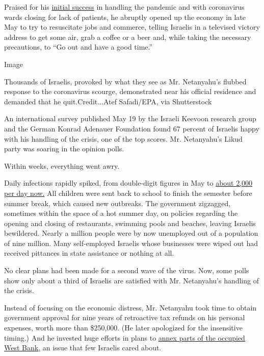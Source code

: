 Praised for his
\href{https://www.nytimes3xbfgragh.onion/2020/03/13/world/middleeast/israel-coronavirus-netanyahu.html?searchResultPosition=1}{initial
success} in handling the pandemic and with coronavirus wards closing for
lack of patients, he abruptly opened up the economy in late May to try
to resuscitate jobs and commerce, telling Israelis in a televised
victory address to get some air, grab a coffee or a beer and, while
taking the necessary precautions, to ``Go out and have a good time.''

Image

Thousands of Israelis, provoked by what they see as Mr. Netanyahu's
flubbed response to the coronavirus scourge, demonstrated near his
official residence and demanded that he quit.Credit...Atef Safadi/EPA,
via Shutterstock

An international survey published May 19 by the Israeli Keevoon research
group and the German Konrad Adenauer Foundation found 67 percent of
Israelis happy with his handling of the crisis, one of the top scores.
Mr. Netanyahu's Likud party was soaring in the opinion polls.

Within weeks, everything went awry.

Daily infections rapidly spiked, from double-digit figures in May to
\href{https://ourworldindata.org/coronavirus-data-explorer?zoomToSelection=true\&country=~ISR\&casesMetric=true\&dailyFreq=true\&hideControls=true\&smoothing=0\&pickerMetric=location\&pickerSort=asc}{about
2,000 per day now.} All children were sent back to school to finish the
semester before summer break, which caused new outbreaks. The government
zigzagged, sometimes within the space of a hot summer day, on policies
regarding the opening and closing of restaurants, swimming pools and
beaches, leaving Israelis bewildered. Nearly a million people were by
now unemployed out of a population of nine million. Many self-employed
Israelis whose businesses were wiped out had received pittances in state
assistance or nothing at all.

No clear plans had been made for a second wave of the virus. Now, some
polls show only about a third of Israelis are satisfied with Mr.
Netanyahu's handling of the crisis.

Instead of focusing on the economic distress, Mr. Netanyahu took time to
obtain government approval for nine years of retroactive tax refunds on
his personal expenses, worth more than \$250,000. (He later apologized
for the insensitive timing.) And he invested huge efforts in plans to
\href{https://www.nytimes3xbfgragh.onion/2020/07/01/world/middleeast/israel-annexation-netanyahu-johnson.html?searchResultPosition=3}{annex
parts of the occupied West Bank}, an issue that few Israelis cared
about.

